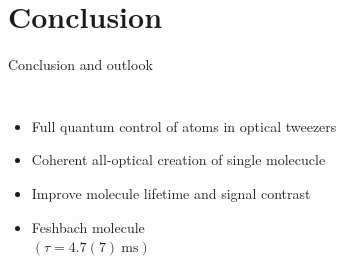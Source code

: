 \documentclass{beamer}
\begin{document}
\section{Conclusion}
\begin{frame}[t]{Conclusion and outlook}
  \vspace{-0.5cm}
  \begin{columns}
    \column{6cm}
    \begin{itemize}
    \item Full quantum control of atoms in optical tweezers
    \item Coherent all-optical creation of single molecucle
    \item<2-> Improve molecule lifetime and signal contrast
    \item<3-> Feshbach molecule\\
      {\small $\left(\tau=4.7(7)\ \mathrm{ms}\right)$}
    \end{itemize}
    \column{5.8cm}
\end{columns}
\end{frame}
\end{document}
